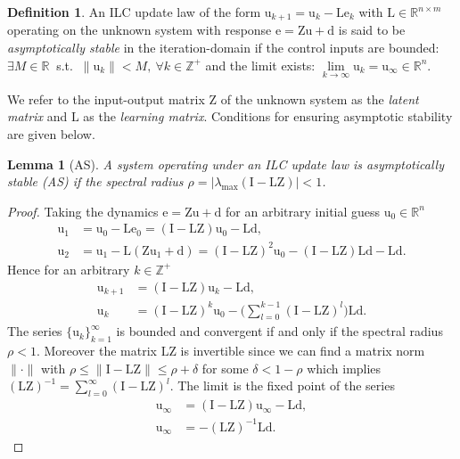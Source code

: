 \documentclass[10pt,a4paper]{article}
\theoremstyle{plain}
\newtheorem{lem}{Lemma}
\theoremstyle{definition}
\newtheorem{defn}{Definition}[section]
\newcommand{\boldvec}[1]{\boldsymbol{\mathrm{#1}}}
\let\vec\boldvec
\newcommand{\error}{\vec{e}} %
\newcommand{\linDist}{\vec{d}} %
\newcommand{\sysInput}{\vec{u}} %
\newcommand{\latentMat}{\vec{Z}} %
\newcommand{\lmatrix}{\vec{L}} %
\begin{document}
\begin{defn} An ILC update law of the form $\sysInput_{k+1} = \sysInput_{k} - \lmatrix \error_{k}$ with $\lmatrix \in \mathbb{R}^{n \times m}$ operating on the unknown system with response $\error = \latentMat \sysInput + \linDist$ is said to be \emph{asymptotically stable} in the iteration-domain if the control inputs are bounded: $\exists M \in \mathbb{R} \ $ s.t. $\ \|\sysInput_k\| < M, \ \forall k \in \mathbb{Z}^{+}$ and the limit exists: $\lim\limits_{k \to \infty}\sysInput_k = \sysInput_{\infty} \in \mathbb{R}^{n}$. \end{defn}
%
We refer to the input-output matrix $\latentMat$ of the unknown system as the \emph{latent matrix} and $\lmatrix$ as the \emph{learning matrix}. Conditions for ensuring asymptotic stability are given below.
%
\begin{lem}[AS] \label{AS} A system operating under an ILC update law is asymptotically stable (AS) if the spectral radius $\rho = |\lambda_{\mathrm{max}}(\vec{I} - \lmatrix\latentMat)| < 1$. \end{lem}
%
\begin{proof}
Taking the dynamics $\error = \latentMat \sysInput + \linDist$ for an arbitrary initial guess $\sysInput_0 \in \mathbb{R}^{n}$
\begin{align}
\sysInput_1 &= \sysInput_0 - \lmatrix\error_0 = (\vec{I} - \lmatrix\latentMat)\sysInput_0 - \lmatrix\linDist, \\
\sysInput_2 &= \sysInput_1 - \lmatrix(\latentMat\sysInput_1 + \linDist) = (\vec{I} - \lmatrix\latentMat)^{2}\sysInput_0 - (\vec{I} - \lmatrix\latentMat)\lmatrix\linDist - \lmatrix\linDist.
\end{align}
%
\noindent Hence for an arbitrary $k \in \mathbb{Z}^{+}$
%
\begin{align}
\sysInput_{k+1} &= (\vec{I} - \lmatrix\latentMat)\sysInput_{k} - \lmatrix\linDist, \\
\sysInput_k &= (\vec{I} - \lmatrix\latentMat)^{k}\sysInput_0 - \Big(\sum_{l=0}^{k-1}(\vec{I} - \lmatrix\latentMat)^{l}\Big)\lmatrix\linDist.
\end{align}
%
\noindent The series $\{\sysInput_{k}\}_{k=1}^{\infty}$ is bounded and convergent if and only if the spectral radius $\rho < 1$. Moreover the matrix $\lmatrix\latentMat$ is invertible since we can find a matrix norm $\|\cdot\|$ with $\rho \leq \|\vec{I} - \lmatrix\latentMat\| \leq \rho + \delta$ for some $\delta < 1 - \rho$ which implies $(\lmatrix\latentMat)^{-1} = \sum_{l=0}^{\infty}(\vec{I} - \lmatrix\latentMat)^{l}$. The limit is the fixed point of the series
%
\begin{align}
\sysInput_{\infty} &= (\vec{I} - \lmatrix\latentMat)\sysInput_{\infty} - \lmatrix\linDist, \\
\sysInput_{\infty} &= -(\lmatrix\latentMat)^{-1}\lmatrix\linDist.
\end{align}
%
\end{proof}
\end{document}
